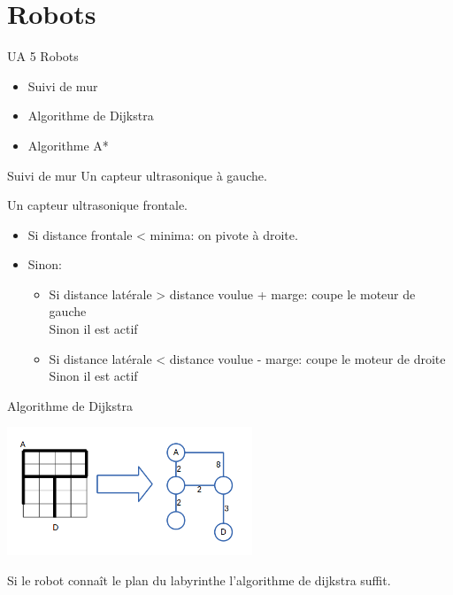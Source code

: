\documentclass{beamer}
\begin{document}
\section{Robots}
  \begin{frame}{UA 5 Robots}
      \begin{itemize}
          \item Suivi de mur
          \item Algorithme de Dijkstra
          \item Algorithme A*
      \end{itemize}
  \end{frame}
  \begin{frame}{Suivi de mur}
    Un capteur ultrasonique à gauche.

    Un capteur ultrasonique frontale.

    \begin{itemize}
      \item Si distance frontale < minima: on pivote à droite.
      \item Sinon:
      \begin{itemize}
        \item Si distance latérale > distance voulue + marge: coupe le moteur
        de gauche \\Sinon il est actif \item Si distance latérale < distance
          voulue - marge: coupe le moteur de droite \\Sinon il est actif
      \end{itemize}
    \end{itemize}
  \end{frame}

  \begin{frame}{Algorithme de Dijkstra}
    \begin{center}
      \includegraphics[width=0.55\textwidth]{jeux/GRO_graph1} \\
    \end{center}
    Si le robot connaît le plan du labyrinthe l'algorithme de dijkstra suffit. 
  \end{frame}
\end{document}
